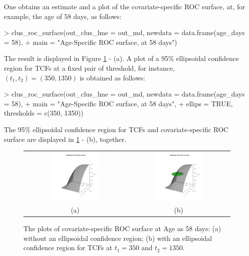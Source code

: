 One obtains an estimate and a plot of the covariate-specific ROC surface, at, for example, the age of 58 days, as follows:
{
\begin{example}
> clus_roc_surface(out_clus_lme = out_md, newdata = data.frame(age_days = 58), 
+                  main = "Age-Specific ROC surface, at 58 days")
\end{example}
}
\noindent
The result is displayed in Figure \ref{fig:ROC-surface} - (a). A plot of a 95\% ellipsoidal confidence region for TCFs at a fixed pair of threshold, for instance, $(t_1, t_2) = (350, 1350)$ is obtained as follows:
{
\begin{example}
> clus_roc_surface(out_clus_lme = out_md, newdata = data.frame(age_days = 58), 
+                  main = "Age-Specific ROC surface, at 58 days", 
+                  ellips = TRUE, thresholds = c(350, 1350))
\end{example}
}
\noindent
The 95\% ellipsoidal confidence region for TCFs and covariate-specific ROC surface are displayed in \ref{fig:ROC-surface} - (b), together.
\begin{figure}[htbp]
  \centering
  \begin{tabular}{@{}c @{}c}
  \includegraphics[width=0.5\textwidth]{ROCS_Age_58.png} & \includegraphics[width=0.5\textwidth]{ROCS_Age_58_ellip.png} \\
  (a) & (b)
  \end{tabular}
  \caption{The plots of covariate-specific ROC surface at Age as 58 days: (a) without an ellipsoidal confidence region; (b) with an ellipsoidal confidence region for TCFs at $t_1 = 350$ and $t_2 = 1350$.}
  \label{fig:ROC-surface}
\end{figure}

